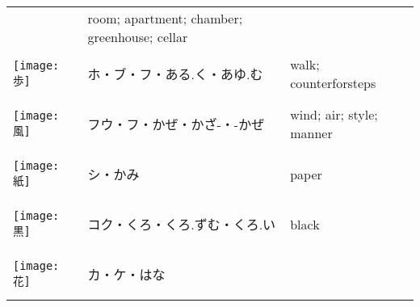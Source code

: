 \documentclass[a4paper,12pt]{extarticle}
\begin{document}
\begin{longtable}{|lp{6cm}p{4cm}|}
&
room; apartment; chamber; greenhouse; cellar
\\ 
\begin{minipage}{0.3\textwidth}
\centerline{
	\texttt{[image: 歩]}
}
\end{minipage}
&
\begin{CJK}{UTF8}{min}ホ・ブ・フ・ある.く・あゆ.む\end{CJK}
&
walk; counterforsteps
\\ 
\begin{minipage}{0.3\textwidth}
\centerline{
	\texttt{[image: 風]}
}
\end{minipage}
&
\begin{CJK}{UTF8}{min}フウ・フ・かぜ・かざ-・-かぜ\end{CJK}
&
wind; air; style; manner
\\ 
\begin{minipage}{0.3\textwidth}
\centerline{
	\texttt{[image: 紙]}
}
\end{minipage}
&
\begin{CJK}{UTF8}{min}シ・かみ\end{CJK}
&
paper
\\ 
\begin{minipage}{0.3\textwidth}
\centerline{
	\texttt{[image: 黒]}
}
\end{minipage}
&
\begin{CJK}{UTF8}{min}コク・くろ・くろ.ずむ・くろ.い\end{CJK}
&
black
\\ 
\begin{minipage}{0.3\textwidth}
\centerline{
	\texttt{[image: 花]}
}
\end{minipage}
&
\begin{CJK}{UTF8}{min}カ・ケ・はな\end{CJK}

\end{longtable}
\end{document}

